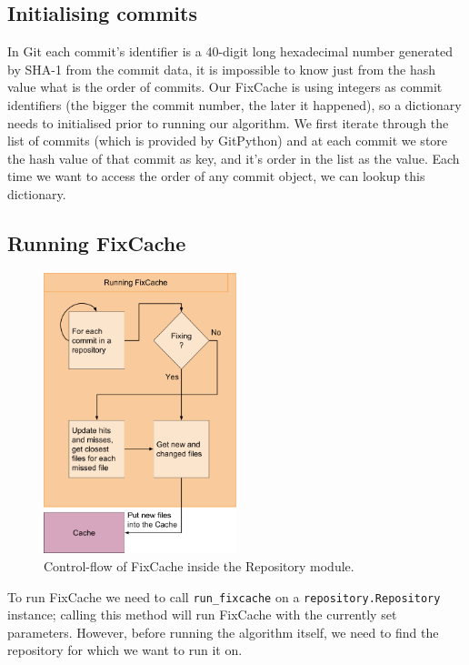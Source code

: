 \documentclass[12pt,twoside,notitlepage]{report}
\newcommand{\fxch}{FixCache}
\begin{document}
\subsection{Initialising commits} In Git each commit's identifier is a 40-digit long hexadecimal number generated by SHA-1 from the commit data, it is impossible to know just from the hash value what is the order of commits. Our \fxch{} is using integers as commit identifiers (the bigger the commit number, the later it happened), so a dictionary needs to initialised prior to running our algorithm. We first iterate through the list of commits (which is provided by GitPython) and at each commit we store the hash value of that commit as key, and it's order in the list as the value. Each time we want to access the order of any commit object, we can lookup this dictionary.
\clearpage
\subsection{Running \fxch{}}
\begin{figure}
\begin{center}
\vspace{-16pt}
\includegraphics[width=0.5\textwidth]{repository_module.png}
\end{center}
\caption{Control-flow of \fxch{} inside the Repository module.}
\label{run_fxch}
\end{figure}
To run \fxch{} we need to call \texttt{run\_fixcache} on a \texttt{repository.Repository} instance; calling this method will run \fxch{} with the currently set parameters. However, before running the algorithm itself, we need to find the repository for which we want to run it on.
\end{document}
